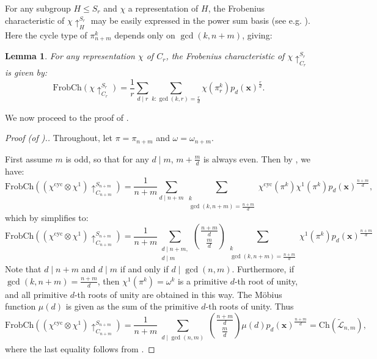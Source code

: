 \documentclass[11pt]{article}
\newtheorem{lemma}[theo]{Lemma}
\theoremstyle{definition}
\numberwithin{equation}{section}
\newcommand\Ltil{\widetilde{\mathcal{L}}}
\newcommand\Ch{\mathrm{Ch}}
\newcommand\FrobCh{\mathrm{FrobCh}}
\begin{document}
For any subgroup $H \le S_r$ and $\chi$ a representation of $H$, the Frobenius characteristic of $\chi \uparrow_H^{S_r}$ may be easily expressed in the power sum basis (see e.g. \cite[Theorem~13]{Swa}). Here the cycle type of $\pi_{n+m}^k$ depends only on $\gcd(k,n+m)$, giving:
\begin{lemma}\label{induced-rep-char}
For any representation $\chi$ of $C_r$, the Frobenius characteristic of $\chi \uparrow_{C_r}^{S_r}$ is given by:
\[
\FrobCh(\chi \uparrow_{C_r}^{S_r}) = \frac{1}{r} \sum_{d \mid r} \sum_{k : \gcd(k,r) = \frac{r}{d}} \chi(\pi_r^k) p_d(\mathbf{x})^{\frac{r}{d}}.
\]
\end{lemma}
We now proceed to the proof of .
\begin{proof}[Proof (of ).]
Throughout, let $\pi = \pi_{n+m}$ and $\omega = \omega_{n+m}$. 

First assume $m$ is odd, so that for any $d \mid m$, $m+\frac{m}{d}$ is always even. Then by , we have:
\[
\FrobCh((\chi^\mathrm{cyc} \otimes \chi^1)\uparrow_{C_{n+m}}^{S_{n+m}}) = \frac{1}{n+m} \sum_{d \mid n+m} \sum_{\substack{k\\\gcd(k,n+m) = \frac{n+m}{d}}} \chi^\mathrm{cyc}(\pi^k) \chi^1(\pi^k) p_d(\mathbf{x})^{\frac{n+m}{d}},
\]
which by  simplifies to:
\[
\FrobCh((\chi^\mathrm{cyc} \otimes \chi^1)\uparrow_{C_{n+m}}^{S_{n+m}}) = \frac{1}{n+m} \sum_{\substack{d \mid n+m, \\ d \mid m}} \binom{\frac{n+m}{d}}{\frac{m}{d}} \sum_{\substack{k \\ \gcd(k,n+m) = \frac{n+m}{d}}} \chi^1(\pi^k) p_d(\mathbf{x})^{\frac{n+m}{d}}
\]
Note that $d \mid n+m$ and $d \mid m$ if and only if $d \mid \gcd(n,m)$. Furthermore, if $\gcd(k,n+m) = \frac{n+m}{d}$, then $\chi^1(\pi^k) = \omega^k$ is a primitive $d$-th root of unity, and all primitive $d$-th roots of unity are obtained in this way. The M{\"o}bius function $\mu(d)$ is given as the sum of the primitive $d$-th roots of unity. Thus
\[
\FrobCh((\chi^\mathrm{cyc} \otimes \chi^1)\uparrow_{C_{n+m}}^{S_{n+m}}) = \frac{1}{n+m} \sum_{\substack{d \mid \gcd(n,m)}} \binom{\frac{n+m}{d}}{\frac{m}{d}} \mu(d) p_d(\mathbf{x})^{\frac{n+m}{d}} = \Ch(\Ltil_{n,m}),
\]
where the last equality follows from .


\end{proof}
\end{document}
